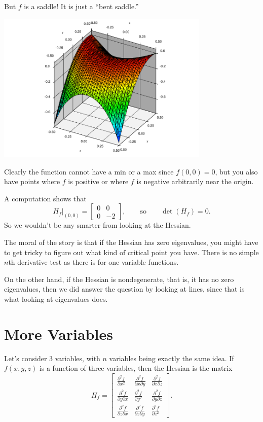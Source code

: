 \documentclass[12pt]{article}
\begin{document}
But $f$ is a saddle!  It is just a ``bent saddle.''
\begin{center}
\includegraphics[width=4.0in]{peanosurface}
\end{center}
Clearly the function cannot have a min or a max since $f(0,0)=0$, but you
also have points where $f$ is positive or where $f$ is negative arbitrarily
near the origin.

A computation shows that
$$
H_f\big|_{(0,0)} =
\begin{bmatrix}
0 & 0 \\
0 & -2
\end{bmatrix}
,
\qquad \text{so} \qquad
\det(H_f) = 0 .
$$
So we wouldn't be any smarter from looking at the Hessian.

The moral of the story is that if the Hessian has zero eigenvalues, you
might have to get tricky to figure out what kind of critical point you have.
There is no simple $n$th derivative test as there is for one variable functions.

On the other hand, if the Hessian is nondegenerate, that is, it has no
zero eigenvalues, then we did answer the question by looking at lines, since
that is what looking at eigenvalues does.

\section{More Variables}

Let's consider 3 variables, with $n$ variables being exactly the same
idea.
If $f(x,y,z)$ is a function of three variables, then
the Hessian is the matrix
\begin{equation*}
H_f
=
\begin{bmatrix}
\frac{\partial^2 f}{\partial x^2} &
\frac{\partial^2 f}{\partial x \partial y} &
\frac{\partial^2 f}{\partial x \partial z}
\\
\frac{\partial^2 f}{\partial y \partial x} &
\frac{\partial^2 f}{\partial y^2} &
\frac{\partial^2 f}{\partial y \partial z}
\\
\frac{\partial^2 f}{\partial z \partial x} &
\frac{\partial^2 f}{\partial z \partial y} &
\frac{\partial^2 f}{\partial z^2}
\end{bmatrix} .
\end{equation*}
\end{document}
